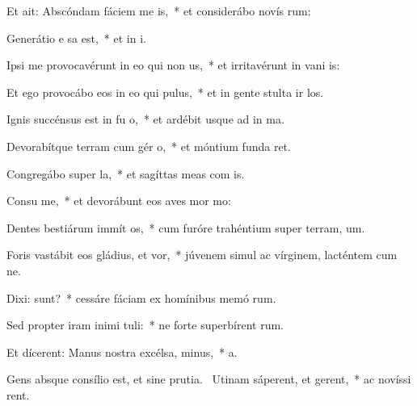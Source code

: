 \item Et ait: Abscóndam fáciem me  is,~* et considerábo novís rum:
\item Generátio e sa est,~* et in i.
\item Ipsi me provocavérunt in eo qui non  us,~* et irritavérunt in vani is:
\item Et ego provocábo eos in eo qui   pulus,~* et in gente stulta ir los.
\item Ignis succénsus est in fu o,~* et ardébit usque ad in ma.
\item Devorabítque terram cum gér o,~* et móntium funda ret.
\item Congregábo super  la,~* et sagíttas meas com  is.
\item Consu me,~* et devorábunt eos aves mor mo:
\item Dentes bestiárum immít  os,~* cum furóre trahéntium super terram,  um.
\item Foris vastábit eos gládius, et  vor,~* júvenem simul ac vírginem, lacténtem cum  ne.
\item Dixi:  sunt?~* cessáre fáciam ex homínibus memó rum.
\item Sed propter iram inimi tuli:~* ne forte superbírent  rum.
\item Et dícerent: Manus nostra excélsa,   minus,~*   a.
\item Gens absque consílio est, et sine prutia.~\pscross{} Utinam sáperent, et gerent,~* ac novíssi rent.

